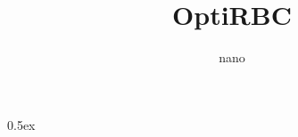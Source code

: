 \documentclass[11pt,a4paper]{article}
\begin{document}
\title{OptiRBC}
\author{nano}
\maketitle

\tableofcontents

\parindent 0pt\parskip 0.5ex



%
%
\end{document}
